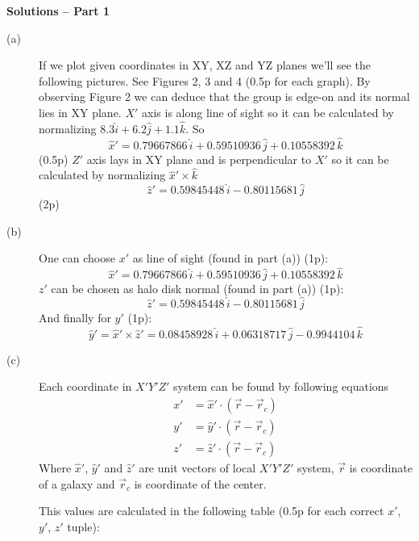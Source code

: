 \textbf{Solutions -- Part 1}

\begin{description}
\item[(a)] If we plot given coordinates in XY, XZ and YZ planes we'll see
  the following pictures. See Figures 2, 3 and 4 (0.5p for each graph).
  By observing Figure 2 we can deduce that the group is edge-on and its
  normal lies in XY plane. $X'$ axis is along line of sight so it can be
  calculated by normalizing
  $8.3\hat{i} + 6.2\hat{j} + 1.1\hat{k}$. So
  \[ \hat{x}' = 0.79667866\,\hat{i} + 0.59510936\,\hat{j}
     + 0.10558392\,\hat{k} \]
  (0.5p) $Z'$ axis lays in XY plane and is perpendicular to $X'$ so it
  can be calculated by normalizing $\hat{x}'\times\hat{k}$
  \[ \hat{z}' = 0.59845448\,\hat{i} - 0.80115681\,\hat{j} \]
  \hfill(2p)

\item[(b)] One can choose $x'$ as line of sight (found in part (a)) (1p):
  \[ \hat{x}' = 0.79667866\,\hat{i} + 0.59510936\,\hat{j}
     + 0.10558392\,\hat{k} \]
  $z'$ can be chosen as halo disk normal (found in part (a)) (1p):
  \[ \hat{z}' = 0.59845448\,\hat{i} - 0.80115681\,\hat{j} \]
  And finally for $y'$ (1p):
  \[ \hat{y}' = \hat{x}'\times\hat{z}'
     = 0.08458928\,\hat{i} + 0.06318717\,\hat{j} - 0.9944104\,\hat{k} \]

\item[(c)] Each coordinate in $X'Y'Z'$ system can be found by following
  equations
  \begin{align*}
  x' &= \hat{x}'\cdot(\vec{r} - \vec{r}_c)\\
  y' &= \hat{y}'\cdot(\vec{r} - \vec{r}_c)\\
  z' &= \hat{z}'\cdot(\vec{r} - \vec{r}_c)
  \end{align*}
  Where $\hat{x}'$, $\hat{y}'$ and $\hat{z}'$ are unit vectors of local
  $X'Y'Z'$ system, $\vec{r}$ is coordinate of a galaxy and $\vec{r}_c$
  is coordinate of the center.

  This values are calculated in the following table (0.5p for each
  correct $x'$, $y'$, $z'$ tuple):


\end{description}
